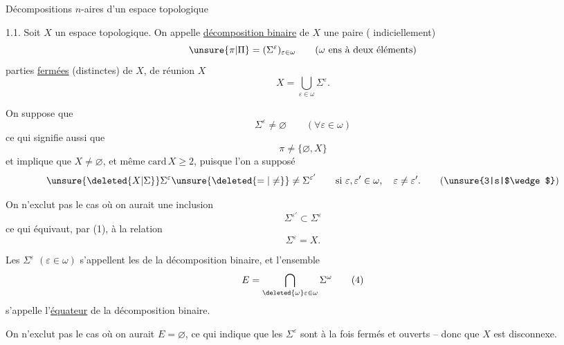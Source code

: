 \begingroup
\makeatletter\tagsleft@true\makeatother

\noindent Décompositions $n$-aires d'un espace topologique

1.1. Soit $X$ un espace topologique. On appelle \uline{décomposition binaire} de $X$ une paire ( indiciellement)
\[
\unsure{\pi|\Pi}=(\Sigma^\varepsilon)_{\varepsilon\in\omega}\qquad(\omega\ \text{ens à deux éléments})
\]
  parties \uline{fermées} (distinctes) de $X$, de réunion $X$
\[
X=\bigcup_{\varepsilon\in\omega}\Sigma^\varepsilon.\tag*{(1)}
\]

On suppose que
\[
\Sigma^\varepsilon\ne\varnothing\qquad(\forall\varepsilon\in\omega)\tag*{(2)}
\]
ce qui signifie aussi que
\[
\pi\ne\{\varnothing,X\}\tag*{$(2')$}
\]
et implique que $X\ne\varnothing$, et même $\mathrm{card}\,X\geq 2$, puisque l'on a supposé
\[
\unsure{\deleted{X|\Sigma}}\Sigma^\varepsilon\unsure{\deleted{=|\ne}}\ne\Sigma^{\varepsilon'}\qquad\text{si }\varepsilon,\varepsilon'\in\omega,\quad\varepsilon\ne\varepsilon'.\tag*{(\unsure{3|s|$\wedge$})}
\]

On n'exclut pas le cas où on aurait une inclusion
\[
\Sigma^{\varepsilon'}\subset\Sigma^\varepsilon
\]
ce qui équivaut, par (1), à la relation
\[
\Sigma^\varepsilon=X.
\]

Les $\Sigma^\varepsilon$ $(\varepsilon\in\omega)$ s'appellent les \uline{} de la décomposition binaire,  et l'ensemble
\[
E=\bigcap_{\deleted{\omega}\varepsilon\in\omega}\Sigma^\omega\tag*{(4)}
\]
s'appelle l'\uline{équateur} de la décomposition binaire.

On n'exclut pas le cas où on aurait $E=\varnothing$, ce qui indique que les $\Sigma^\varepsilon$ \inserted{$(\varepsilon\in\omega)$} sont  à la fois fermés et ouverts -- donc que $X$ est disconnexe.
\endgroup
